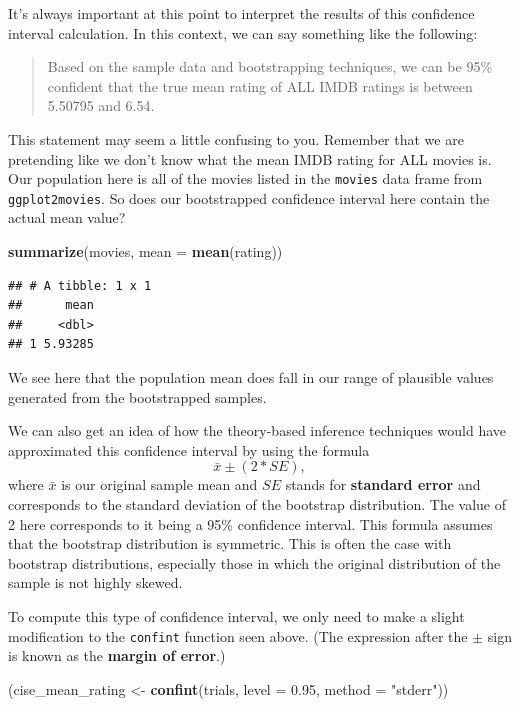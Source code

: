\documentclass[]{tufte-book}
\newenvironment{Shaded}{\begin{snugshade}}{\end{snugshade}}
\newcommand{\KeywordTok}[1]{\textcolor[rgb]{0.13,0.29,0.53}{\textbf{{#1}}}}
\newcommand{\DataTypeTok}[1]{\textcolor[rgb]{0.13,0.29,0.53}{{#1}}}
\newcommand{\FloatTok}[1]{\textcolor[rgb]{0.00,0.00,0.81}{{#1}}}
\newcommand{\StringTok}[1]{\textcolor[rgb]{0.31,0.60,0.02}{{#1}}}
\newcommand{\NormalTok}[1]{{#1}}
\begin{document}
It's always important at this point to interpret the results of this
confidence interval calculation. In this context, we can say something
like the following:

\begin{quote}
Based on the sample data and bootstrapping techniques, we can be 95\%
confident that the true mean rating of ALL IMDB ratings is between
5.50795 and 6.54.
\end{quote}

This statement may seem a little confusing to you. Remember that we are
pretending like we don't know what the mean IMDB rating for ALL movies
is. Our population here is all of the movies listed in the
\texttt{movies} data frame from \texttt{ggplot2movies}. So does our
bootstrapped confidence interval here contain the actual mean value?

\begin{Shaded}
\begin{Highlighting}[]
\KeywordTok{summarize}\NormalTok{(movies, }\DataTypeTok{mean =} \KeywordTok{mean}\NormalTok{(rating))}
\end{Highlighting}
\end{Shaded}

\begin{verbatim}
## # A tibble: 1 x 1
##      mean
##     <dbl>
## 1 5.93285
\end{verbatim}

We see here that the population mean does fall in our range of plausible
values generated from the bootstrapped samples.

We can also get an idea of how the theory-based inference techniques
would have approximated this confidence interval by using the formula
\[\bar{x} \pm (2 * SE),\] where \(\bar{x}\) is our original sample mean
and \(SE\) stands for \textbf{standard error} and corresponds to the
standard deviation of the bootstrap distribution. The value of 2 here
corresponds to it being a 95\% confidence interval. This formula assumes
that the bootstrap distribution is symmetric. This is often the case
with bootstrap distributions, especially those in which the original
distribution of the sample is not highly skewed.

To compute this type of confidence interval, we only need to make a
slight modification to the \texttt{confint} function seen above. (The
expression after the \(\pm\) sign is known as the \textbf{margin of
error}.)

\begin{Shaded}
\begin{Highlighting}[]
\NormalTok{(cise_mean_rating <-}\StringTok{ }\KeywordTok{confint}\NormalTok{(trials, }\DataTypeTok{level =} \FloatTok{0.95}\NormalTok{, }\DataTypeTok{method =} \StringTok{"stderr"}\NormalTok{))}
\end{Highlighting}
\end{Shaded}
\end{document}
